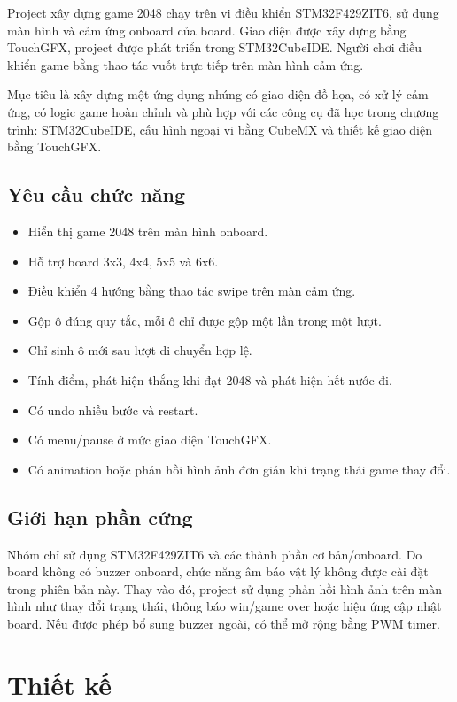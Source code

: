 \documentclass[12pt,a4paper]{article}
\begin{document}
Project xây dựng game 2048 chạy trên vi điều khiển STM32F429ZIT6, sử dụng màn hình và cảm ứng onboard của board. Giao diện được xây dựng bằng TouchGFX, project được phát triển trong STM32CubeIDE. Người chơi điều khiển game bằng thao tác vuốt trực tiếp trên màn hình cảm ứng.

Mục tiêu là xây dựng một ứng dụng nhúng có giao diện đồ họa, có xử lý cảm ứng, có logic game hoàn chỉnh và phù hợp với các công cụ đã học trong chương trình: STM32CubeIDE, cấu hình ngoại vi bằng CubeMX và thiết kế giao diện bằng TouchGFX.

\subsection{Yêu cầu chức năng}

\begin{itemize}
    \item Hiển thị game 2048 trên màn hình onboard.
    \item Hỗ trợ board 3x3, 4x4, 5x5 và 6x6.
    \item Điều khiển 4 hướng bằng thao tác swipe trên màn cảm ứng.
    \item Gộp ô đúng quy tắc, mỗi ô chỉ được gộp một lần trong một lượt.
    \item Chỉ sinh ô mới sau lượt di chuyển hợp lệ.
    \item Tính điểm, phát hiện thắng khi đạt 2048 và phát hiện hết nước đi.
    \item Có undo nhiều bước và restart.
    \item Có menu/pause ở mức giao diện TouchGFX.
    \item Có animation hoặc phản hồi hình ảnh đơn giản khi trạng thái game thay đổi.
\end{itemize}

\subsection{Giới hạn phần cứng}

Nhóm chỉ sử dụng STM32F429ZIT6 và các thành phần cơ bản/onboard. Do board không có buzzer onboard, chức năng âm báo vật lý không được cài đặt trong phiên bản này. Thay vào đó, project sử dụng phản hồi hình ảnh trên màn hình như thay đổi trạng thái, thông báo win/game over hoặc hiệu ứng cập nhật board. Nếu được phép bổ sung buzzer ngoài, có thể mở rộng bằng PWM timer.

\section{Thiết kế}
\end{document}

